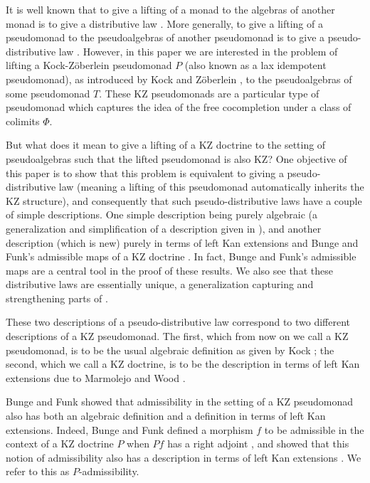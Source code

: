 \documentclass[a4paper,oneside,english]{amsart}
\numberwithin{equation}{section}
\numberwithin{figure}{section}
\theoremstyle{plain}
\theoremstyle{definition}
\theoremstyle{remark}
\theoremstyle{definition}
\theoremstyle{plain}
\theoremstyle{plain}
\theoremstyle{plain}
\begin{document}
It is well known that to give a lifting of a monad to the algebras
of another monad is to give a distributive law \cite{beckdist}. More
generally, to give a lifting of a pseudomonad to the pseudoalgebras
of another pseudomonad is to give a pseudo-distributive law \cite{marm1999,cheng2003}.
However, in this paper we are interested in the problem of lifting
a Kock-Z\"{o}berlein pseudomonad $P$ (also known as a lax idempotent
pseudomonad), as introduced by Kock \cite{kock1972} and Z\"{o}berlein
\cite{zober1976}, to the pseudoalgebras of some pseudomonad $T$.
These KZ pseudomonads are a particular type of pseudomonad which captures
the idea of the free cocompletion under a class of colimits $\Phi$.

But what does it mean to give a lifting of a KZ doctrine to the setting
of pseudoalgebras such that the lifted pseudomonad is also KZ? One
objective of this paper is to show that this problem is equivalent
to giving a pseudo-distributive law (meaning a lifting of this pseudomonad
automatically inherits the KZ structure), and consequently that such
pseudo-distributive laws have a couple of simple descriptions. One
simple description being purely algebraic (a generalization and simplification
of a description given in \cite{marm1999}), and another description
(which is new) purely in terms of left Kan extensions and Bunge and
Funk's admissible maps of a KZ doctrine \cite{bungefunk}. In fact,
Bunge and Funk's admissible maps are a central tool in the proof of
these results. We also see that these distributive laws are essentially
unique, a generalization capturing \cite[Theorem 7.4]{marm2012} and
strengthening parts of \cite[Prop. 4.1]{marm2002}.

These two descriptions of a pseudo-distributive law correspond to
two different descriptions of a KZ pseudomonad. The first, which from
now on we call a KZ pseudomonad, is to be the usual algebraic definition
as given by Kock \cite{kock1972}; the second, which we call a KZ
doctrine, is to be the description in terms of left Kan extensions
due to Marmolejo and Wood \cite[Definition 3.1]{marm2012}.

Bunge and Funk showed that admissibility in the setting of a KZ pseudomonad
also has both an algebraic definition and a definition in terms of
left Kan extensions. Indeed, Bunge and Funk defined a morphism $f$
to be admissible in the context of a KZ doctrine $P$ when $Pf$ has
a right adjoint \cite[Definition 1.1]{bungefunk}, and showed that
this notion of admissibility also has a description in terms of left
Kan extensions \cite[Prop. 1.5]{bungefunk}. We refer to this as $P$-admissibility.
\end{document}

